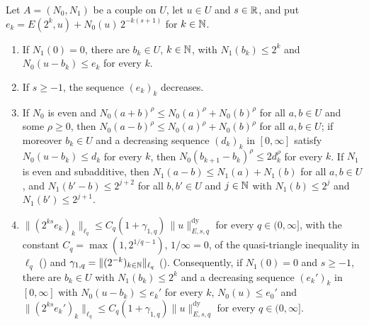 \begin{lemma}
\label{lem:e-near-best}
\leanok
{}
Let $A = (N_0, N_1)$ be a couple on $U$, let $u \in U$ and $s \in \mathbb{R}$, and put
$e_k = E(2^k, u) + N_0(u) \, 2^{-k(s+1)}$ for $k \in \mathbb{N}$.
\begin{enumerate}
  \item If $N_1(0) = 0$, there are $b_k \in U$, $k \in \mathbb{N}$, with $N_1(b_k) \leq 2^k$ and
    $N_0(u - b_k) \leq e_k$ for every $k$.
  \item If $s \geq -1$, the sequence $(e_k)_k$ decreases.
  \item If $N_0$ is even and $N_0(a + b)^\rho \leq N_0(a)^\rho + N_0(b)^\rho$ for all
    $a, b \in U$ and some $\rho \geq 0$, then $N_0(a - b)^\rho \leq N_0(a)^\rho + N_0(b)^\rho$
    for all $a, b \in U$; if moreover $b_k \in U$ and a decreasing sequence $(d_k)_k$ in
    $[0, \infty]$ satisfy $N_0(u - b_k) \leq d_k$ for every $k$, then
    $N_0(b_{k+1} - b_k)^\rho \leq 2 d_k^\rho$ for every $k$. If $N_1$ is even and subadditive,
    then $N_1(a - b) \leq N_1(a) + N_1(b)$ for all $a, b \in U$, and $N_1(b' - b) \leq 2^{j+2}$
    for all $b, b' \in U$ and $j \in \mathbb{N}$ with $N_1(b) \leq 2^j$ and $N_1(b') \leq 2^{j+1}$.
  \item $\|(2^{ks} e_k)_k\|_{\ell_q} \leq C_q (1 + \gamma_{1, q}) \,
    \|u\|^{\mathrm{dy}}_{E, s, q}$ for every $q \in (0, \infty]$, with the constant
    $C_q = \max(1, 2^{1/q - 1})$, $1/\infty = 0$, of the quasi-triangle inequality in $\ell_q$
    () and $\gamma_{1, q} = \|(2^{-k})_{k \in \mathbb{N}}\|_{\ell_q}$
    (). Consequently, if
    $N_1(0) = 0$ and $s \geq -1$, there are $b_k \in U$ with $N_1(b_k) \leq 2^k$ and a
    decreasing sequence $(e_k')_k$ in $[0, \infty]$ with $N_0(u - b_k) \leq e_k'$ for every $k$,
    $N_0(u) \leq e_0'$ and
    $\|(2^{ks} e_k')_k\|_{\ell_q} \leq C_q (1 + \gamma_{1, q}) \|u\|^{\mathrm{dy}}_{E, s, q}$ for
    every $q \in (0, \infty]$.
\end{enumerate}
\end{lemma}

